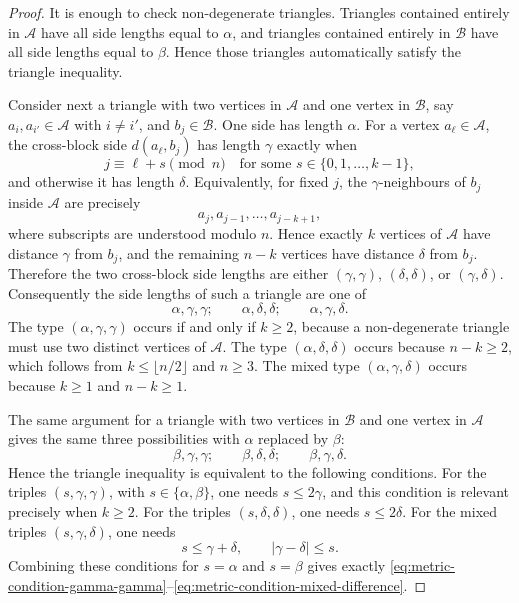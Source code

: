 \documentclass[11pt]{amsart}
\numberwithin{equation}{section}
\theoremstyle{definition}
\theoremstyle{remark}
\newcommand{\cA}{\mathcal{A}}
\newcommand{\cB}{\mathcal{B}}
\begin{document}
\begin{proof}
It is enough to check non-degenerate triangles.  Triangles contained entirely
in \(\cA\) have all side lengths equal to \(\alpha\), and triangles contained
entirely in \(\cB\) have all side lengths equal to \(\beta\).  Hence those
triangles automatically satisfy the triangle inequality.

Consider next a triangle with two vertices in \(\cA\) and one vertex in
\(\cB\), say \(a_i,a_{i'}\in\cA\) with \(i\neq i'\), and \(b_j\in\cB\).  One
side has length \(\alpha\).  For a vertex \(a_\ell\in\cA\), the cross-block
side \(d(a_\ell,b_j)\) has length \(\gamma\) exactly when
\begin{equation}\label{eq:gamma-congruence-A}
j\equiv \ell+s \pmod{n}
\quad\text{for some }s\in\{0,1,\ldots,k-1\},
\end{equation}
and otherwise it has length \(\delta\).  Equivalently, for fixed \(j\), the
\(\gamma\)-neighbours of \(b_j\) inside \(\cA\) are precisely
\begin{equation}\label{eq:gamma-neighbours-A}
a_j,a_{j-1},\ldots,a_{j-k+1},
\end{equation}
where subscripts are understood modulo \(n\).  Hence exactly \(k\) vertices
of \(\cA\) have distance \(\gamma\) from \(b_j\), and the remaining
\(n-k\) vertices have distance \(\delta\) from \(b_j\).  Therefore the two
cross-block side lengths are either \((\gamma,\gamma)\), \((\delta,\delta)\),
or \((\gamma,\delta)\).  Consequently the side lengths of such a triangle are
one of
\begin{equation}\label{eq:triangle-types-A}
\alpha,\gamma,\gamma;\qquad
\alpha,\delta,\delta;\qquad
\alpha,\gamma,\delta.
\end{equation}
The type \((\alpha,\gamma,\gamma)\) occurs if and only if \(k\geq2\), because
a non-degenerate triangle must use two distinct vertices of \(\cA\).  The type
\((\alpha,\delta,\delta)\) occurs because \(n-k\geq2\), which follows from
\(k\leq\lfloor n/2\rfloor\) and \(n\geq3\).  The mixed type
\((\alpha,\gamma,\delta)\) occurs because \(k\geq1\) and \(n-k\geq1\).

The same argument for a triangle with two vertices in \(\cB\) and one vertex
in \(\cA\) gives the same three possibilities with \(\alpha\) replaced by
\(\beta\):
\begin{equation}\label{eq:triangle-types-B}
\beta,\gamma,\gamma;\qquad
\beta,\delta,\delta;\qquad
\beta,\gamma,\delta.
\end{equation}
Hence the triangle inequality is equivalent to the following conditions.  For
the triples \((s,\gamma,\gamma)\), with \(s\in\{\alpha,\beta\}\), one needs
\(s\leq2\gamma\), and this condition is relevant precisely when \(k\geq2\).
For the triples \((s,\delta,\delta)\), one needs \(s\leq2\delta\).  For the
mixed triples \((s,\gamma,\delta)\), one needs
\begin{equation}\label{eq:mixed-triangle-equivalent}
s\leq\gamma+\delta,
\qquad
|\gamma-\delta|\leq s.
\end{equation}
Combining these conditions for \(s=\alpha\) and \(s=\beta\) gives exactly
\eqref{eq:metric-condition-gamma-gamma}--\eqref{eq:metric-condition-mixed-difference}.
\end{proof}
\end{document}
